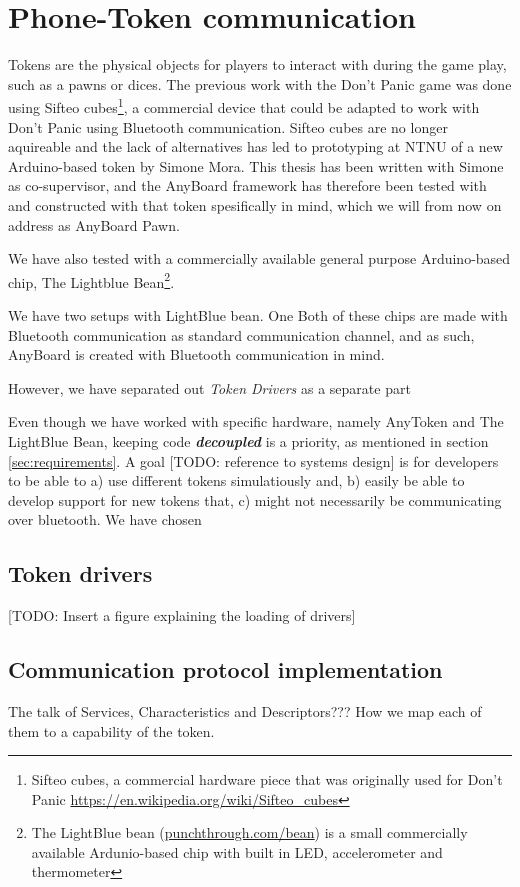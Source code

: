 \section{Phone-Token communication} \label{impl:ble_communication}
Tokens are the physical objects for players to interact with during the game play, such as a pawns or dices. The previous work with the Don't Panic game was done using Sifteo cubes\footnote{Sifteo cubes, a commercial hardware piece that was originally used for Don't Panic \href{https://en.wikipedia.org/wiki/Sifteo\_cubes}{https://en.wikipedia.org/wiki/Sifteo\_cubes}}, a commercial device that could be adapted to work with Don't Panic using Bluetooth communication. Sifteo cubes are no longer aquireable and the lack of alternatives has led to prototyping at NTNU of a new Arduino-based token by Simone Mora. This thesis has been written with Simone as co-supervisor, and the AnyBoard framework has therefore been tested with and constructed with that token spesifically in mind, which we will from now on address as AnyBoard Pawn. 

We have also tested with a commercially available general purpose Arduino-based chip, The Lightblue Bean\footnote{The LightBlue bean (\href{http://punchthrough.com/bean/}{punchthrough.com/bean}) is a small commercially available Ardunio-based chip with built in LED, accelerometer and thermometer}.

We have two setups with LightBlue bean. One 
Both of these chips are made with Bluetooth communication as standard communication channel, and as such, AnyBoard is created with Bluetooth communication in mind.

However, we have separated out \emph{Token Drivers} as a separate part

Even though we have worked with specific hardware, namely AnyToken and The LightBlue Bean, keeping code \textbf{\emph{decoupled}} is a priority, as mentioned in section \ref{sec:requirements}. A goal [TODO: reference to systems design] is for developers to be able to a) use different tokens simulatiously and, b) easily be able to develop support for new tokens that, c) might not necessarily be communicating over bluetooth. We have chosen 

\subsection{Token drivers}
[TODO: Insert a figure explaining the loading of drivers]

\subsection{Communication protocol implementation}
The talk of Services, Characteristics and Descriptors???
How we map each of them to a capability of the token.

